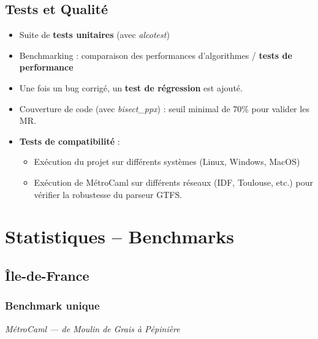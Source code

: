 \documentclass[12pt,a4paper]{article}
\begin{document}
\subsection{Tests et Qualité}

\begin{itemize}
    \item Suite de \textbf{tests unitaires} (avec \textit{alcotest})
    \item Benchmarking : comparaison des performances d'algorithmes / \textbf{tests de performance}
    \item Une fois un bug corrigé, un \textbf{test de régression} est ajouté.
    \item Couverture de code (avec \textit{bisect\_ppx}) : seuil minimal de 70\% pour valider les MR.
    \item \textbf{Tests de compatibilité} :
    \begin{itemize}
        \item Exécution du projet sur différents systèmes (Linux, Windows, MacOS)
        \item Exécution de MétroCaml sur différents réseaux (IDF, Toulouse, etc.) pour vérifier la robustesse du parseur GTFS.
    \end{itemize}
\end{itemize}

\section{Statistiques -- Benchmarks}

\subsection*{Île-de-France}

\subsubsection*{Benchmark unique}

\begin{center}
\textit{MétroCaml --- de Moulin de Grais à Pépinière}
\end{center}
\end{document}
